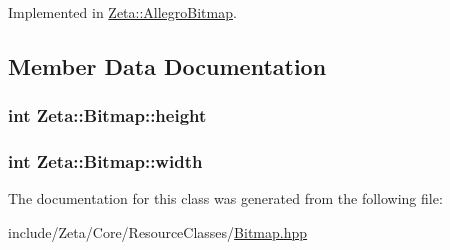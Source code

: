 Implemented in \hyperlink{classZeta_1_1AllegroBitmap_ac37c6b783f388afe960479b9addcf0a7}{Zeta\+::\+Allegro\+Bitmap}.



\subsection{Member Data Documentation}
\hypertarget{classZeta_1_1Bitmap_a4d9a82acc6c418dc9b72227b0d63d9aa}{
\subsubsection[{height}]{\setlength{\rightskip}{0pt plus 5cm}int Zeta\+::\+Bitmap\+::height\hspace{0.3cm}{\ttfamily [protected]}}}\label{classZeta_1_1Bitmap_a4d9a82acc6c418dc9b72227b0d63d9aa}
\hypertarget{classZeta_1_1Bitmap_affa526cccd51b4ac5db7aac25ff7f6a9}{
\subsubsection[{width}]{\setlength{\rightskip}{0pt plus 5cm}int Zeta\+::\+Bitmap\+::width\hspace{0.3cm}{\ttfamily [protected]}}}\label{classZeta_1_1Bitmap_affa526cccd51b4ac5db7aac25ff7f6a9}


The documentation for this class was generated from the following file\+:\begin{DoxyCompactItemize}
\item 
include/\+Zeta/\+Core/\+Resource\+Classes/\hyperlink{Bitmap_8hpp}{Bitmap.\+hpp}\end{DoxyCompactItemize}
